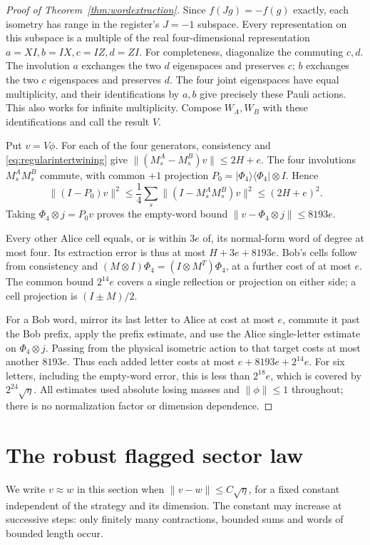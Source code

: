 \begin{proof}[Proof of Theorem~\ref{thm:wordextraction}]
Since $f(Jg)=-f(g)$ exactly, each isometry has range in the register's
$J=-1$ subspace. Every representation on this subspace is a multiple of
the real four-dimensional representation $a=XI,b=IX,c=IZ,d=ZI$.
For completeness, diagonalize the commuting $c,d$. The involution $a$
exchanges the two $d$ eigenspaces and preserves $c$; $b$ exchanges the
two $c$ eigenspaces and preserves $d$. The four joint eigenspaces have
equal multiplicity, and their identifications by $a,b$ give precisely
these Pauli actions. This also works for infinite multiplicity.
Compose $W_A,W_B$ with these identifications and call the result $V$.

Put $v=V\phi$. For each of the four generators, consistency and
\eqref{eq:regularintertwining} give
$\|(M_s^A-M_s^B)v\|\leq2H+e$.
The four involutions $M_s^AM_s^B$ commute, with common $+1$ projection
$P_0=|\Phi_4\rangle\langle\Phi_4|\otimes I$. Hence
\[
\|(I-P_0)v\|^2
\leq\frac14\sum_s\|(I-M_s^AM_s^B)v\|^2\leq(2H+e)^2.
\]
Taking $\Phi_4\otimes j=P_0v$ proves the empty-word bound
$\|v-\Phi_4\otimes j\|\leq8193e$.

Every other Alice cell equals, or is within $3e$ of, its normal-form word
of degree at most four. Its extraction error is thus at most
$H+3e+8193e$. Bob's cells follow from consistency and
$(M\otimes I)\Phi_4=(I\otimes M^T)\Phi_4$, at a further cost of at most
$e$. The common bound $2^{14}e$ covers a single reflection or projection
on either side; a cell projection is $(I\pm M)/2$.

For a Bob word, mirror its last letter to Alice at cost at most $e$,
commute it past the Bob prefix, apply the prefix estimate, and use the
Alice single-letter estimate on $\Phi_4\otimes j$. Passing from the
physical isometric action to that target costs at most another $8193e$.
Thus each added letter costs at most $e+8193e+2^{14}e$.
For six letters, including the empty-word error, this is less than
$2^{18}e$, which is covered by $2^{24}\sqrt\eta$.
All estimates used absolute losing masses and $\|\phi\|\leq1$ throughout;
there is no normalization factor or dimension dependence.
\end{proof}

\section{The robust flagged sector law}\label{sec:robustsector}
We write $v\approx w$ in this section when
$\|v-w\|\leq C\sqrt\eta$, for a fixed constant independent of the
strategy and its dimension. The constant may increase at successive
steps: only finitely many contractions, bounded sums and words of bounded
length occur.


